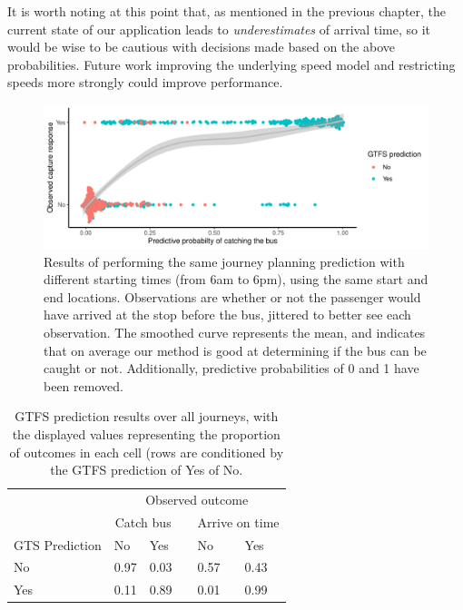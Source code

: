 It is worth noting at this point that, as mentioned in the previous chapter, the current state of our application leads to \emph{underestimates} of arrival time, so it would be wise to be cautious with decisions made based on the above probabilities. Future work improving the underlying speed model and restricting speeds more strongly could improve performance.




\begin{knitrout}\small
{}\color{fgcolor}\begin{figure}

{\centering \includegraphics[width=\textwidth]{figure/eta_journey_results_avg-1} 

}

\caption[Results of performing the same journey planning prediction with different starting times (from 6am to 6pm), using the same start and end locations]{Results of performing the same journey planning prediction with different starting times (from 6am to 6pm), using the same start and end locations. Observations are whether or not the passenger would have arrived at the stop before the bus, jittered to better see each observation. The smoothed curve represents the mean, and indicates that on average our method is good at determining if the bus can be caught or not. Additionally, predictive probabilities of 0 and 1 have been removed.}\label{fig:eta_journey_results_avg}
\end{figure}

\begin{table}

\caption{\label{tab:eta_journey_results_avg}GTFS prediction results over all journeys, with the displayed values representing the proportion of outcomes in each cell (rows are conditioned by the GTFS prediction of Yes of No. }
\centering
\fontsize{8}{10}\selectfont
\begin{tabular}[t]{llllll}
\toprule
\multicolumn{1}{c}{} & \multicolumn{5}{c}{Observed outcome} \\
\cmidrule(l{3pt}r{3pt}){2-6}
\multicolumn{1}{c}{ } & \multicolumn{2}{c}{Catch bus} & \multicolumn{1}{c}{} & \multicolumn{2}{c}{Arrive on time} \\
\cmidrule(l{3pt}r{3pt}){2-3} \cmidrule(l{3pt}r{3pt}){5-6}
GTS Prediction & No & Yes &  & No & Yes\\
\midrule
No & 0.97 & 0.03 &  & 0.57 & 0.43\\
Yes & 0.11 & 0.89 &  & 0.01 & 0.99\\
\bottomrule
\end{tabular}
\end{table}



\end{knitrout}
